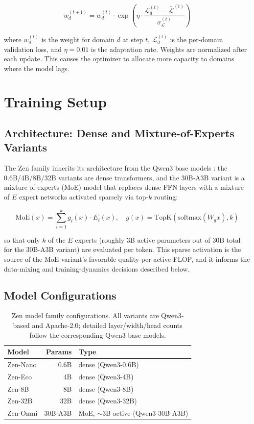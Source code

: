 \documentclass[11pt,a4paper]{article}
\begin{document}
\begin{equation}
w_d^{(t+1)} = w_d^{(t)} \cdot \exp\left(\eta \cdot \frac{\mathcal{L}_d^{(t)} - \bar{\mathcal{L}}^{(t)}}{\sigma_\mathcal{L}^{(t)}}\right)
\end{equation}

where $w_d^{(t)}$ is the weight for domain $d$ at step $t$, $\mathcal{L}_d^{(t)}$ is
the per-domain validation loss, and $\eta = 0.01$ is the adaptation rate. Weights
are normalized after each update. This causes the optimizer to allocate more capacity
to domains where the model lags.

\section{Training Setup}

\subsection{Architecture: Dense and Mixture-of-Experts Variants}

The Zen family inherits its architecture from the Qwen3 base models \cite{qwen3}: the
0.6B/4B/8B/32B variants are dense transformers, and the 30B-A3B variant is a
mixture-of-experts (MoE) model that replaces dense FFN layers with a mixture of $E$
expert networks activated sparsely via top-$k$ routing:

\begin{equation}
\text{MoE}(x) = \sum_{i=1}^{k} g_i(x) \cdot E_i(x), \quad g(x) = \text{TopK}(\text{softmax}(W_g x), k)
\end{equation}

so that only $k$ of the $E$ experts (roughly 3B active parameters out of 30B total for
the 30B-A3B variant) are evaluated per token. This sparse activation is the source of the
MoE variant's favorable quality-per-active-FLOP, and it informs the data-mixing and
training-dynamics decisions described below.

\subsection{Model Configurations}

\begin{table}[H]
\centering
\begin{tabular}{lrl}
\toprule
\textbf{Model} & \textbf{Params} & \textbf{Type} \\
\midrule
Zen-Nano & 0.6B & dense (Qwen3-0.6B) \\
Zen-Eco  & 4B   & dense (Qwen3-4B) \\
Zen-8B   & 8B   & dense (Qwen3-8B) \\
Zen-32B  & 32B  & dense (Qwen3-32B) \\
Zen-Omni & 30B-A3B & MoE, $\sim$3B active (Qwen3-30B-A3B) \\
\bottomrule
\end{tabular}
\caption{Zen model family configurations. All variants are Qwen3-based and Apache-2.0;
detailed layer/width/head counts follow the corresponding Qwen3 base models.}
\end{table}
\end{document}
